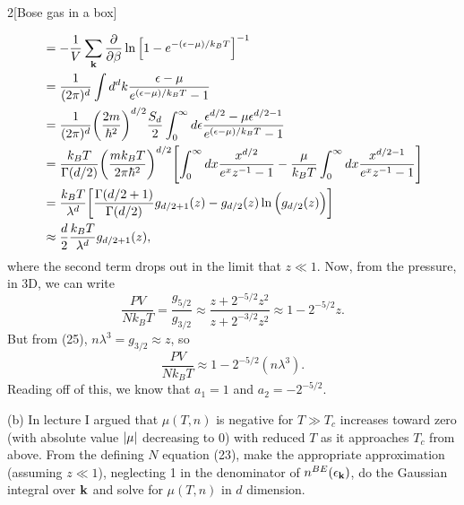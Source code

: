 \documentclass[12pt]{article}
\begin{document}
\begin{problem}{2}[Bose gas in a box]
\begin{solution}
\begin{align}
               &=-\frac1V\sum_{\vb{k}}\frac{\partial}{\partial\beta}\ln\qty[1-e^{-(\epsilon-\mu)/k_BT}]^{-1}\notag\\
               &=\frac1{(2\pi)^d}\int
               d^dk\frac{\epsilon-\mu}{e^{(\epsilon-\mu)/k_BT}-1}\notag\\
               &=\frac{1}{(2\pi)^d}\qty(\frac{2m}{\hbar^2})^{d/2}\frac{S_d}{2}\int_0^\infty
               d\epsilon\frac{\epsilon^{d/2}-\mu
               \epsilon^{d/2-1}}{e^{(\epsilon-\mu)/k_BT}-1}\notag\\
               &=\frac{k_BT}{\Gamma(d/2)}\qty(\frac{mk_BT}{2\pi\hbar^2})^{d/2}
               \qty[\int_0^\infty
               dx\frac{x^{d/2}}{e^xz^{-1}-1}-\frac{\mu}{k_BT}\int_0^\infty
               dx\frac{x^{d/2-1}}{e^xz^{-1}-1}]\notag\\
               &=\frac{k_BT}{\lambda^d}\qty[\frac{\Gamma(d/2+1)}{\Gamma(d/2)}g_{d/2+1}(z)-g_{d/2}(z)\ln\qty(g_{d/2}(z))]\notag\\
               &\approx\frac{d}{2}\frac{k_BT}{\lambda^d}g_{d/2+1}(z),
\end{align}
where the second term drops out in the limit that $z\ll 1$. Now, from the
pressure, in 3D, we can write
\begin{equation}
    \frac{PV}{Nk_BT}=\frac{g_{5/2}}{g_{3/2}}
    \approx\frac{z+2^{-5/2}z^2}{z+2^{-3/2}z^2}
    \approx 1-2^{-5/2}z.
\end{equation}
But from (25), $n\lambda^3=g_{3/2}\approx z$, so
\begin{equation}
    \frac{PV}{Nk_BT}\approx1-2^{-5/2}(n\lambda^3). 
\end{equation}
Reading off of this, we know that $a_1=1$ and $a_2=-2^{-5/2}$.
\end{solution}

(b) In lecture I argued that $\mu(T,n)$ is negative for $T\gg T_c$ increases
toward zero (with absolute value $\abs{\mu}$ decreasing to 0) with reduced $T$ 
as it approaches $T_c$ from above. From the defining $N$ equation (23), make the
appropriate approximation (assuming $z\ll1$), neglecting 1 in the denominator
of $n^{BE}(\epsilon_{\vb{k}})$, do the Gaussian integral over $\vb{k}$ and solve
for $\mu(T,n)$ in $d$ dimension.


\end{problem}
\end{document}
